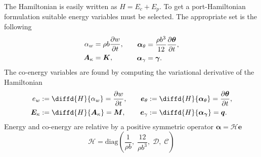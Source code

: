 \documentclass{ifacconf}
\begin{document}
The Hamiltonian  is easily written as $H = E_c + E_p$. To get a port-Hamiltonian formulation suitable energy variables must be selected. The appropriate set is the following
\begin{equation}
\begin{aligned}
\alpha_w &= \rho b \diffp{w}{t}, \\
\bm{A}_{\kappa} &= \bm{K}, \\
\end{aligned} \qquad
\begin{aligned}
\bm\alpha_{\theta} &= \frac{\rho b^3}{12} \diffp{\bm{\theta}}{t}, \\
\bm\alpha_{\gamma} &= \bm{\gamma}. \\
\end{aligned}
\end{equation}
The co-energy variables are found by computing the variational derivative of the Hamiltonian
\begin{equation}
\begin{aligned}
e_w &:= \diffd{H}{\alpha_w} = \diffp{w}{t},  \\
\bm{E}_{\kappa} &:= \diffd{H}{\bm{A}_{\kappa}} = \bm{M}, \\
\end{aligned} \qquad
\begin{aligned}
\bm{e}_{\theta} &:= \diffd{H}{\bm\alpha_{\theta}} = \diffp{\bm{\theta}}{t}, \\
\bm{e}_{\gamma} &:= \diffd{H}{\bm{\alpha}_{\bm{\gamma}}} = \bm{q}. \\
\end{aligned}
\end{equation}
Energy and co-energy are relative by a positive symmetric operator $\bm{\alpha} = \mathcal{H} \bm{e}$
\begin{equation}
\mathcal{H} = \mathrm{diag}(\frac{1}{\rho b}, \; \frac{12}{\rho b^3} , \; \mathcal{D}, \; \mathcal{C})
\end{equation}
\end{document}
